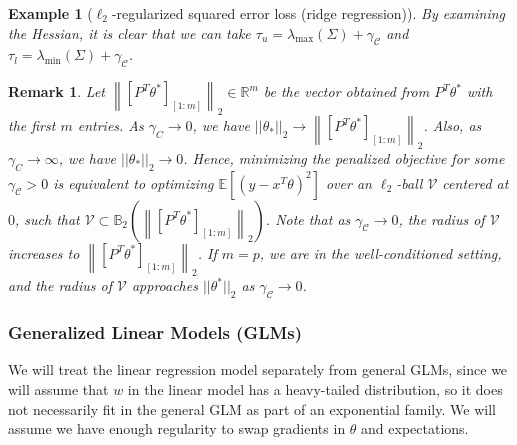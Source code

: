 \documentclass{article}
\newtheorem{example}{Example}
\newtheorem{remark}{\textbf{Remark}}
\begin{document}
\begin{example} [$\ell_2$-regularized squared error loss (ridge regression)]
By examining the Hessian, it is clear that we can take $\tau_u = \lambda_{\max}(\Sigma) + \gamma_{\mathcal{C}}$ and $\tau_l = \lambda_{\min}(\Sigma) + \gamma_{\mathcal{C}}$. 
\end{example}

\begin{remark}
Let $\left\|[P^T\theta^*]_{[1:m]}\right\|_2 \in \mathbb{R}^m$ be the vector obtained from $P^T\theta^*$ with the first $m$ entries. As $\gamma_C \rightarrow 0$, we have $||\theta_*||_2 \rightarrow \left\|[P^T\theta^*]_{[1:m]}\right\|_2$. Also, as $\gamma_C \rightarrow \infty$, we have $||\theta_*||_2 \rightarrow 0$. Hence, minimizing the penalized objective for some $\gamma_{\mathcal{C}} > 0$ is equivalent to optimizing $\mathbb{E}[(y - x^T\theta)^2]$ over an $\ell_2$-ball $\mathcal{V}$ centered at $0$, such that $\mathcal{V} \subset \mathbb{B}_2\left(\left\|[P^T\theta^*]_{[1:m]}\right\|_2\right)$. Note that as $\gamma_{\mathcal{C}} \rightarrow 0$, the radius of $\mathcal{V}$ increases to $\left\|[P^T\theta^*]_{[1:m]}\right\|_2$. If $m = p$, we are in the well-conditioned setting, and the radius of $\mathcal{V}$ approaches $||\theta^*||_2$ as $\gamma_{\mathcal{C}} \rightarrow 0$.
\end{remark}


\subsubsection{Generalized Linear Models (GLMs)}\label{sec:Generalized Linear Models (GLM)}

We will treat the linear regression model separately from general GLMs, since we will assume that $w$ in the linear model has a heavy-tailed distribution, so it does not necessarily fit in the general GLM as part of an exponential family. We will assume we have enough regularity to swap gradients in $\theta$ and expectations.
\end{document}
